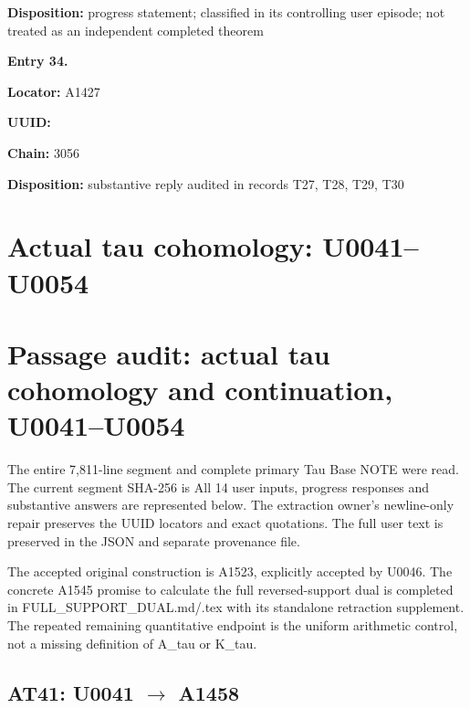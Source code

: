 \textbf{Disposition:} progress statement; classified in its controlling
user episode; not treated as an independent completed theorem


\textbf{Entry 34.}

\textbf{Locator:} A1427

\textbf{UUID:} \protect{}

\textbf{Chain:} 3056

\textbf{Disposition:} substantive reply audited in records T27, T28,
T29, T30

\clearpage

\section{Actual tau cohomology:
U0041--U0054}\label{TranscriptLedgerStage:actual-tau-cohomology-u0041u0054}

\section{Passage audit: actual tau cohomology and continuation,
U0041--U0054}\label{TranscriptLedgerStage:passage-audit-actual-tau-cohomology-and-continuation-u0041u0054}

The entire 7,811-line segment and complete primary Tau Base NOTE were
read. The current segment SHA-256 is
\protect{}
All 14 user inputs, progress responses and substantive answers are
represented below. The extraction owner's newline-only repair preserves
the UUID locators and exact quotations. The full user text is preserved
in the JSON and separate provenance file.

The accepted original construction is A1523, explicitly accepted by
U0046. The concrete A1545 promise to calculate the full reversed-support
dual is completed in FULL\_SUPPORT\_DUAL.md/.tex with its standalone
retraction supplement. The repeated remaining quantitative endpoint is
the uniform arithmetic control, not a missing definition of A\_tau or
K\_tau.

\subsection{\texorpdfstring{AT41: U0041
\allowbreak{}\ensuremath{→}\allowbreak{}
A1458}{AT41: U0041  A1458}}\label{TranscriptLedgerStage:at41-u0041-a1458}

